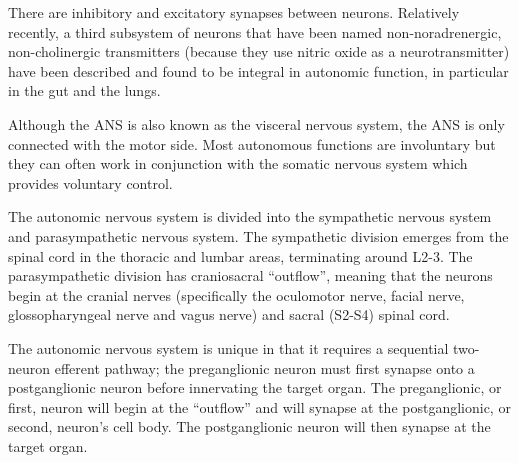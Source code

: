 \documentclass[]{book}
\begin{document}
There are inhibitory and excitatory synapses between neurons. Relatively recently, a third subsystem of neurons that have been named non-noradrenergic, non-cholinergic transmitters (because they use nitric oxide as a neurotransmitter) have been described and found to be integral in autonomic function, in particular in the gut and the lungs.

Although the ANS is also known as the visceral nervous system, the ANS is only connected with the motor side. Most autonomous functions are involuntary but they can often work in conjunction with the somatic nervous system which provides voluntary control.

The autonomic nervous system is divided into the sympathetic nervous system and parasympathetic nervous system. The sympathetic division emerges from the spinal cord in the thoracic and lumbar areas, terminating around L2-3. The parasympathetic division has craniosacral ``outflow'', meaning that the neurons begin at the cranial nerves (specifically the oculomotor nerve, facial nerve, glossopharyngeal nerve and vagus nerve) and sacral (S2-S4) spinal cord.

The autonomic nervous system is unique in that it requires a sequential two-neuron efferent pathway; the preganglionic neuron must first synapse onto a postganglionic neuron before innervating the target organ. The preganglionic, or first, neuron will begin at the ``outflow'' and will synapse at the postganglionic, or second, neuron's cell body. The postganglionic neuron will then synapse at the target organ.
\end{document}
